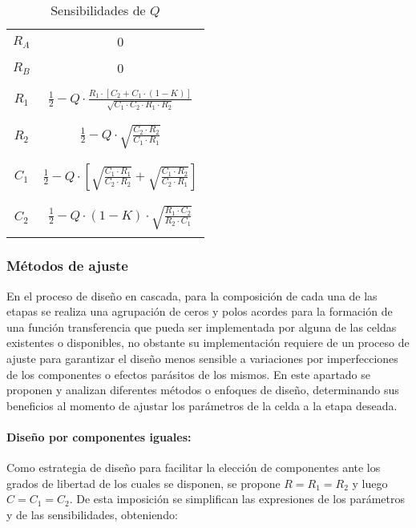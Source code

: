 \begin{table}[H]
    \centering
    \begin{tabular}{c | c}
        \hline \\
        $R_A$ & $0$ \\
        \\ \hline \\
        $R_B$ & $0$ \\ 
        \\ \hline \\
        $R_1$ & $\frac{1}{2} - Q \cdot \frac{R_1 \cdot \left[ C_2 + C_1 \cdot (1 - K) \right]}{\sqrt{C_1 \cdot C_2 \cdot R_1 \cdot R_2}}$ \\
        \\ \hline \\
        $R_2$ & $\frac{1}{2} - Q \cdot \sqrt{\frac{C_2 \cdot R_2}{C_1 \cdot R_1}}$ \\
        \\ \hline \\
        $C_1$ & $\frac{1}{2} - Q \cdot \left[ \sqrt{\frac{C_1 \cdot R_1}{C_2 \cdot R_2}} + \sqrt{\frac{C_1 \cdot R_2}{C_2 \cdot R_1}} \right]$ \\
        \\ \hline \\
        $C_2$ & $\frac{1}{2} - Q \cdot (1-K) \cdot \sqrt{\frac{R_1 \cdot C_2}{R_2 \cdot C_1}}$ \\
        \\ \hline
    \end{tabular}
    \caption{Sensibilidades de $Q$}
\end{table}

\subsubsection{M\'etodos de ajuste}
En el proceso de dise\~no en cascada, para la composici\'on de cada una de las etapas se realiza una agrupaci\'on de ceros y polos acordes para la formaci\'on de una 
funci\'on transferencia que pueda ser implementada por alguna de las celdas existentes o disponibles, no obstante su implementaci\'on requiere de un proceso de ajuste para garantizar
el dise\~no menos sensible a variaciones por imperfecciones de los componentes o efectos par\'asitos de los mismos. En este apartado se proponen y analizan diferentes m\'etodos o enfoques de dise\~no, 
determinando sus beneficios al momento de ajustar los par\'ametros de la celda a la etapa deseada.

\paragraph{Dise\~no por componentes iguales:} Como estrategia de dise\~no para facilitar la elecci\'on de componentes ante los grados de libertad de los cuales se disponen,
se propone $R = R_1 = R_2$ y luego $C = C_1 = C_2$. De esta imposici\'on se simplifican las expresiones de los par\'ametros y de las sensibilidades, obteniendo:

